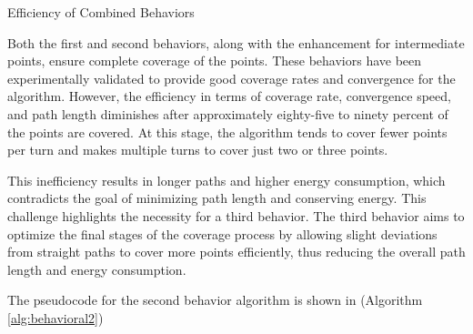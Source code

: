 \vspace*{6mm}   

Efficiency of Combined Behaviors

Both the first and second behaviors, along with the enhancement for intermediate points, ensure complete coverage of the points. These behaviors have been experimentally validated to provide good coverage rates and convergence for the algorithm. However, the efficiency in terms of coverage rate, convergence speed, and path length diminishes after approximately eighty-five to ninety percent of the points are covered. At this stage, the algorithm tends to cover fewer points per turn and makes multiple turns to cover just two or three points.

\vspace*{6mm}   

This inefficiency results in longer paths and higher energy consumption, which contradicts the goal of minimizing path length and conserving energy. This challenge highlights the necessity for a third behavior. The third behavior aims to optimize the final stages of the coverage process by allowing slight deviations from straight paths to cover more points efficiently, thus reducing the overall path length and energy consumption.

\vspace*{6mm}   

The pseudocode for the second behavior algorithm is shown in (Algorithm \autoref{alg:behavioral2})

